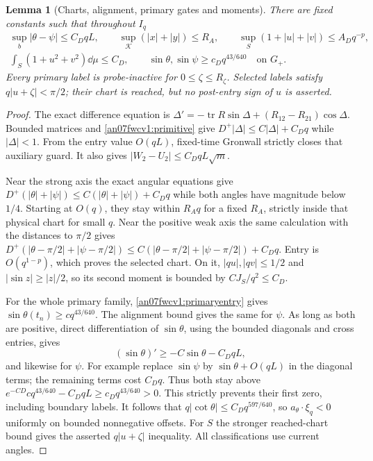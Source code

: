 \documentclass[11pt]{article}
\numberwithin{equation}{section}
\newtheorem{lemma}[theorem]{Lemma}
\newcommand{\KK}{\mathcal K}\newcommand{\BB}{\mathcal B}
\newcommand{\Gp}{G_+}\newcommand{\EE}{\mathfrak E}
\begin{document}
\begin{lemma}[Charts, alignment, primary gates and moments]
\label{an07fwcv1:charts}
There are fixed constants such that throughout \(I_q\)
\begin{gather}
 \sup_b|\theta-\psi|\le C_DqL,\qquad
 \sup_\KK(|x|+|y|)\le R_A,\qquad
 \sup_S(1+|u|+|v|)\le A_Dq^{-p},\label{an07fwcv1:chartsizes}\\
 \int_S(1+u^2+v^2)\dd\mu\le C_D,\qquad
 \sin\theta,\sin\psi\ge c_Dq^{43/640}\quad\text{on }\Gp.
 \label{an07fwcv1:momentsgates}
\end{gather}
Every primary label is probe-inactive for \(0\le\zeta\le R_\zeta\).
Selected labels satisfy \(q|u+\zeta|<\pi/2\); their chart is
reached, but no post-entry sign of \(u\) is asserted.
\end{lemma}
\begin{proof}
The exact difference equation is
\(\Delta'=-\operatorname{tr}R\sin\Delta+(R_{12}-R_{21})\cos\Delta\).
Bounded matrices and \eqref{an07fwcv1:primitive} give
\(D^+|\Delta|\le C|\Delta|+C_Dq\) while \(|\Delta|<1\).
From the entry value \(O(qL)\), fixed-time Gronwall strictly
closes that auxiliary guard. It also gives
\(|W_2-U_2|\le C_DqL\sqrt m\).

Near the strong axis the exact angular equations give
\(D^+(|\theta|+|\psi|)\le C(|\theta|+|\psi|)+C_Dq\)
while both angles have magnitude below \(1/4\).
Starting at \(O(q)\), they stay within \(R_Aq\) for a fixed
\(R_A\), strictly inside that physical chart for small \(q\).
Near the positive weak axis the same calculation with the
distances to \(\pi/2\) gives
\(D^+(|\theta-\pi/2|+|\psi-\pi/2|)
\le C(|\theta-\pi/2|+|\psi-\pi/2|)+C_Dq\).
Entry is \(O(q^{1-p})\), which proves the selected chart.
On it, \(|qu|,|qv|\le1/2\) and \(|\sin z|\ge|z|/2\),
so its second moment is bounded by \(C J_S/q^2\le C_D\).

For the whole primary family, \eqref{an07fwcv1:primaryentry}
gives \(\sin\theta(t_n)\ge c q^{43/640}\).
The alignment bound gives the same for \(\psi\).
As long as both are positive, direct differentiation of
\(\sin\theta\), using the bounded diagonals and cross entries,
gives
\[
 (\sin\theta)'\ge-C\sin\theta-C_DqL,
\]
and likewise for \(\psi\). For example replace \(\sin\psi\)
by \(\sin\theta+O(qL)\) in the diagonal terms; the remaining
terms cost \(C_Dq\). Thus both stay above
\(e^{-CD}c q^{43/640}-C_DqL\ge c_Dq^{43/640}>0\).
This strictly prevents their first zero, including boundary labels.
It follows that \(q|\cot\theta|\le C_Dq^{597/640}\), so
\(a_\theta\cdot\xi_q<0\) uniformly on bounded nonnegative offsets.
For \(S\) the stronger reached-chart bound gives the asserted
\(q|u+\zeta|\) inequality. All classifications use current angles.
\end{proof}
\end{document}
